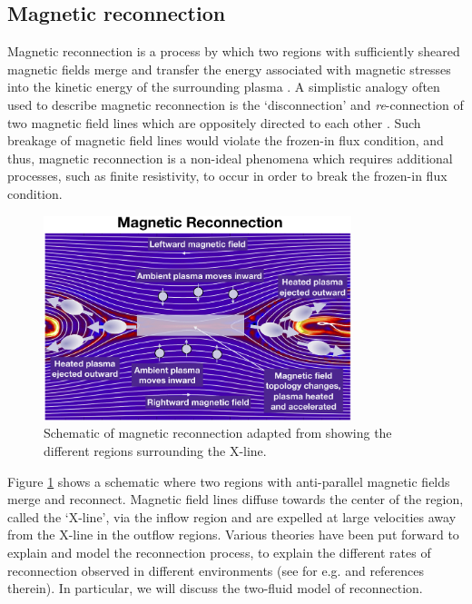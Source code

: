\subsection{Magnetic reconnection}
Magnetic reconnection is a process by which two regions with sufficiently sheared magnetic fields merge and transfer the energy associated with magnetic stresses into the kinetic energy of the surrounding plasma \cite{Priest2000MagneticReconnection,Yamada2010MagneticReconnection}. A simplistic analogy often used to describe magnetic reconnection is the `disconnection' and \emph{re}-connection of two magnetic field lines which are oppositely directed to each other \cite{Gonzalez2016FundamentalReconnection}. Such breakage of magnetic field lines would violate the frozen-in flux condition, and thus, magnetic reconnection is a non-ideal phenomena which requires additional processes, such as finite resistivity, to occur in order to break the frozen-in flux condition. 

\begin{figure}
    \centering
    \includegraphics[width=0.8\textwidth]{images1/magnetic-reconnection-cartoon.png}
    \caption{Schematic of magnetic reconnection adapted from \protect{} showing the different regions surrounding the X-line.}
    \label{fig:chp1-reconnection-cartoon}
\end{figure}

Figure \ref{fig:chp1-reconnection-cartoon} shows a schematic where two regions with anti-parallel magnetic fields merge and reconnect. Magnetic field lines diffuse towards the center of the region, called the `X-line', via the inflow region and are expelled at large velocities away from the X-line in the outflow regions. Various theories have been put forward to explain and model the reconnection process, to explain the different rates of reconnection observed in different environments (see for e.g.  and references therein). In particular, we will discuss the two-fluid model of reconnection. 

